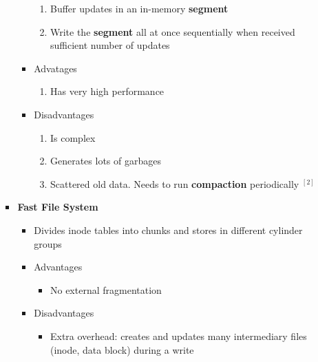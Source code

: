 \documentclass[12pt]{article}
\begin{document}
\begin{enumerate}[1.]
\begin{enumerate}[1)]
\begin{itemize}
\begin{itemize}
                \bigskip

                \begin{enumerate}[1.]
                    \item Buffer updates in an in-memory \textbf{segment}
                    \item Write the \textbf{segment} all at once sequentially when received sufficient number of updates
                \end{enumerate}

                \item Advatages

                \begin{enumerate}[1.]
                    \item Has very high performance
                \end{enumerate}

                \item Disadvantages

                \begin{enumerate}[1.]
                    \item Is complex
                    \item Generates lots of garbages
                    \item Scattered old data. Needs to run \textbf{compaction} periodically $^{[2]}$
                \end{enumerate}
            \end{itemize}

            \item \textbf{Fast File System}
            \begin{itemize}
                \item Divides inode tables into chunks and stores in different cylinder groups
                \item Advantages
                \begin{itemize}
                    \item No external fragmentation
                \end{itemize}
                \item Disadvantages
                \begin{itemize}
                    \item Extra overhead: creates and updates many intermediary files (inode, data block) during a write
                \end{itemize}
            \end{itemize}
        \end{itemize}


\end{enumerate}
\end{enumerate}
\end{document}
